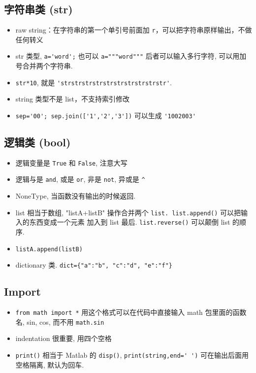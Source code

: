 \subsection{字符串类 (str)}
\begin{itemize}
\item raw string：在字符串的第一个单引号前面加 \verb|r|，可以把字符串原样输出，不做任何转义
\item str 类型, \verb|a='word';| 也可以 \verb|a="""word"""| 后者可以输入多行字符, 可以用加号合并两个字符串.
\item \verb|str*10|, 就是 \verb|'strstrstrstrstrstrstrstrstrstr'|.
\item string 类型不是 list，不支持索引修改
\item \verb|sep='00'; sep.join(['1','2','3'])| 可以生成 \verb|'1002003'|
\end{itemize}

\subsection{逻辑类 (bool)}
\begin{itemize}
\item 逻辑变量是 \verb|True| 和 \verb|False|, 注意大写
\item 逻辑与是 \verb|and|, 或是 \verb|or|, 非是 \verb|not|, 异或是 \verb|^|
\item NoneType, 当函数没有输出的时候返回.
\item list 相当于数组, "listA+listB" 操作合并两个 \verb|list. list.append()| 可以把输入的东西变成一个元素
    加入到 list 最后.  \verb|list.reverse()| 可以颠倒 list 的顺序.
\item \verb|listA.append(listB)|
\item dictionary 类.  \verb|dict={"a":"b", "c":"d", "e":"f"}|
\end{itemize}

\subsection{Import}
\begin{itemize}
\item \verb`from math import *` 用这个格式可以在代码中直接输入 math 包里面的函数名, sin, cos, 而不用 \verb`math.sin`
\item indentation 很重要, 用四个空格
\item \verb`print()` 相当于 Matlab 的 \verb|disp()|, \verb|print(string,end=' ')| 可在输出后面用空格隔离, 默认为回车. 
\end{itemize}

